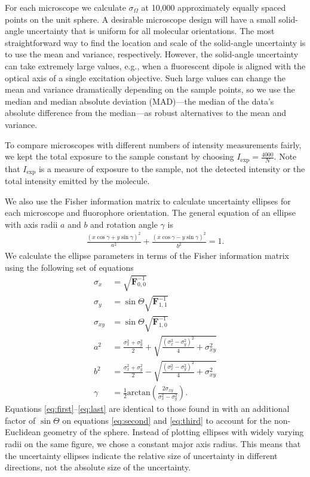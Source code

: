 \documentclass[10pt]{article}
\providecommand{\mb}[1]{\mathbf{#1}}
\begin{document}
For each microscope we calculate $\sigma_{\Omega}$ at 10,000 approximately
equally spaced points on the unit sphere. A desirable microscope design will
have a small solid-angle uncertainty that is uniform for all molecular
orientations. The most straightforward way to find the location and scale of the
solid-angle uncertainty is to use the mean and variance, respectively. However,
the solid-angle uncertainty can take extremely large values, e.g., when a
fluorescent dipole is aligned with the optical axis of a single excitation
objective. Such large values can change the mean and variance dramatically
depending on the sample points, so we use the median and median absolute
deviation (MAD)---the median of the data's absolute difference from the
median---as robust alternatives to the mean and variance.

To compare microscopes with different numbers of intensity measurements fairly,
we kept the total exposure to the sample constant by choosing
$I_{\text{exp}} = \frac{4000}{N}$. Note that $I_{\text{exp}}$ is a measure of
exposure to the sample, not the detected intensity or the total intensity
emitted by the molecule.

We also use the Fisher information matrix to calculate uncertainty ellipses for
each microscope and fluorophore orientation. The general equation of an ellipse
with axis radii $a$ and $b$ and rotation angle $\gamma$ is
\begin{align}
  \frac{(x\cos\gamma + y\sin\gamma)^2}{a^2} + \frac{(x\cos\gamma - y\sin\gamma)^2}{b^2} =1. 
\end{align}
We calculate the ellipse parameters in terms of the Fisher information matrix
using the following set of equations
\begin{align}
  \sigma_x &= \sqrt{\mb{F}^{-1}_{0,0}} \label{eq:first}\\
  \sigma_y &= \sin\Theta\sqrt{\mb{F}^{-1}_{1,1}} \label{eq:second}\\ 
  \sigma_{xy} &= \sin\Theta\sqrt{\mb{F}^{-1}_{1,0}} \label{eq:third}\\  
  a^2 &= \frac{\sigma_x^2 + \sigma_y^2}{2} + \sqrt{\frac{(\sigma_x^2 - \sigma_y^2)^2}{4} + \sigma_{xy}^2}\\
  b^2 &= \frac{\sigma_x^2 + \sigma_y^2}{2} - \sqrt{\frac{(\sigma_x^2 - \sigma_y^2)^2}{4} + \sigma_{xy}^2}\\
  \gamma &= \frac{1}{2}\text{arctan}\left(\frac{2\sigma_{xy}}{\sigma_x^2 - \sigma_y^2}\right). \label{eq:last}
\end{align}
Equations \ref{eq:first}--\ref{eq:last} are identical to those found in
\cite{coe2009} with an additional factor of $\sin\Theta$ on equations
\ref{eq:second} and \ref{eq:third} to account for the non-Euclidean geometry of
the sphere. Instead of plotting ellipses with widely varying radii on the same
figure, we chose a constant major axis radius. This means that the uncertainty
ellipses indicate the relative size of uncertainty in different directions, not
the absolute size of the uncertainty.
\end{document}

